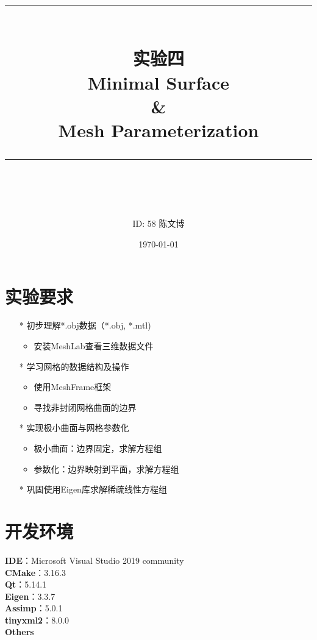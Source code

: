 \documentclass[14pt]{scrartcl} %
\title{	
	\normalfont\normalsize
	\rule{\linewidth}{0.5pt}\\ %
	\vspace{20pt} %
	{\huge 实验四	\\Minimal Surface\\\&\\Mesh Parameterization}\\ %
	\vspace{12pt} %
	\rule{\linewidth}{2pt}\\ %
	\vspace{12pt} %
}
\author{\LARGE ID: 58		陈文博} %
\date{\normalsize\today} %
\begin{document}
\maketitle %


\section{实验要求}


\begin{itemize}
	\item[*] 初步理解*.obj数据（*.obj, *.mtl)
	\begin{itemize}
		\item 安装MeshLab查看三维数据文件
	\end{itemize}
	\item[*] 学习网格的数据结构及操作
	\begin{itemize}
		\item 使用MeshFrame框架
		\item 寻找非封闭网格曲面的边界	
	\end{itemize}
	\item[*] 实现极小曲面与网格参数化
	\begin{itemize}
		\item 极小曲面：边界固定，求解方程组
		\item 参数化：边界映射到平面，求解方程组	
	\end{itemize}
	\item[*] 巩固使用Eigen库求解稀疏线性方程组
	

\end{itemize}


\section{开发环境}

\textbf{IDE}：Microsoft Visual Studio 2019 community\\
\textbf{CMake}：3.16.3\\
\textbf{Qt}：5.14.1\\
\textbf{Eigen}：3.3.7\\
\textbf{Assimp}：5.0.1\\
\textbf{tinyxml2}：8.0.0\\
\textbf{Others}
\end{document}
